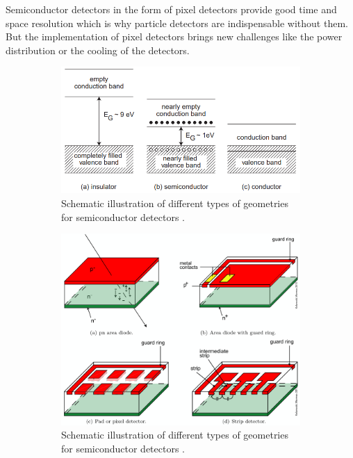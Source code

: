 Semiconductor detectors in the form of pixel detectors provide good time and space resolution which is why particle detectors are indispensable without them.
But the implementation of pixel detectors brings new challenges like the power distribution or the cooling of the detectors.

\begin{figure}
    \centering
    \begin{subfigure}[b]{.48\linewidth}
        \includegraphics[width=\linewidth]{figs/Bandtheory.png}
        \caption{Schematic illustration of different types of geometries for semiconductor detectors \cite{KolanoskiWermes}.}
        \label{fig:geometries}
    \end{subfigure}
    \begin{subfigure}[b]{.48\linewidth}
        \includegraphics[width=\linewidth]{figs/geometry.png}
        \caption{Schematic illustration of different types of geometries for semiconductor detectors \cite{KolanoskiWermes}.}
        \label{fig:geometries}
    \end{subfigure}
    \label{fig:picsSemiconductors}
    \caption{}
\end{figure}